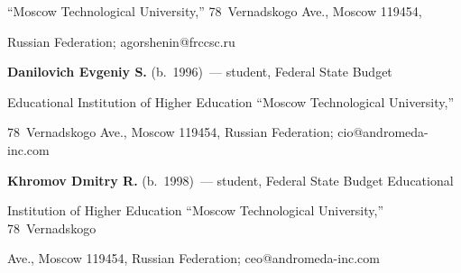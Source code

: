 ``Moscow Technological University,'' 78~Vernadskogo Ave., Moscow 119454, 


Russian Federation; \mbox{agorshenin@frccsc.ru}





\vspace*{3pt}





\noindent


\textbf{Danilovich Evgeniy S.} (b.\ 1996)~--- student, Federal State Budget 


Educational Institution of Higher Education ``Moscow Technological University,'' 


78~Vernadskogo Ave., Moscow 119454, Russian Federation; \mbox{cio@andromeda-inc.com}





\vspace*{3pt}





\noindent


\textbf{Khromov Dmitry R.} (b.\ 1998)~--- student, Federal State Budget Educational 


Institution of Higher Education ``Moscow Technological University,'' 78~Vernadskogo 


Ave., Moscow 119454, Russian Federation; \mbox{ceo@andromeda-inc.com}








\label{end\stat}








\renewcommand{\bibname}{\protect\rm Литература}


